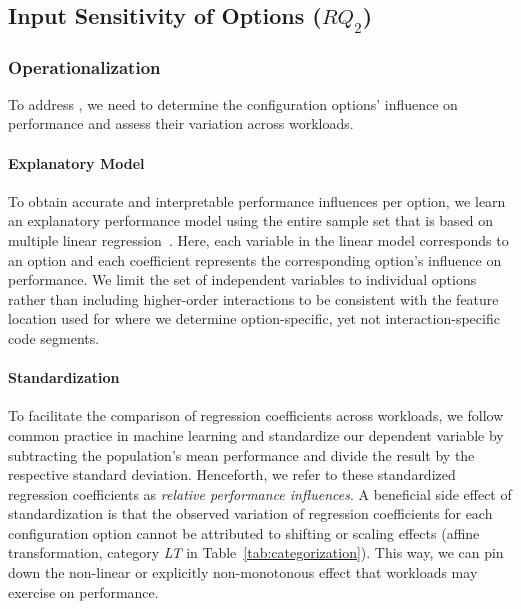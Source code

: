 {\subsection{Input Sensitivity of Options ($RQ_2$)}\label{sec:rq2}

\subsubsection{Operationalization}
To address , we need to determine the configuration options’ influence on performance and assess their variation across workloads. 

\paragraph*{Explanatory Model}
To obtain accurate and interpretable performance influences per option, we learn an explanatory performance model using the entire sample set that is based on multiple linear regression~\cite{dorn2020,siegmundPerformanceinfluenceModelsHighly2015,perLasso}. Here, each variable in the linear model corresponds to an option and each coefficient represents the corresponding option's influence on performance. 
We limit the set of independent variables to individual options rather than including higher-order interactions to be consistent with the feature location used for  where we determine option-specific, yet not interaction-specific code segments.
\paragraph*{Standardization}
To facilitate the comparison of regression coefficients across workloads, we follow common practice in machine learning and standardize our dependent variable by subtracting the population’s mean performance and divide the result by the respective standard deviation. Henceforth, we refer to these standardized regression coefficients as \textit{relative performance influences}. A beneficial side effect of standardization is that the observed variation of regression coefficients for each configuration option cannot be attributed to shifting or scaling effects (affine transformation, category \colorbox{lt-color}{\textit{LT}} in Table~\ref{tab:categorization}). This way, we can pin down  the non-linear or explicitly non-monotonous effect that workloads may exercise on performance.
}
